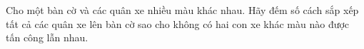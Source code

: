 Cho một bàn cờ và các quân xe nhiều màu khác nhau. Hãy đếm số cách sắp xếp tất cả các quân xe lên bàn cờ sao cho không có hai con xe khác màu nào được tấn công lẫn nhau.